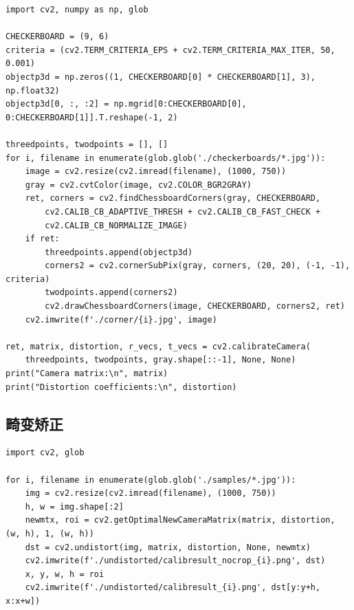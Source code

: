 \documentclass[12pt,a4paper]{ctexart}
\begin{document}
\begin{lstlisting}
import cv2, numpy as np, glob

CHECKERBOARD = (9, 6)
criteria = (cv2.TERM_CRITERIA_EPS + cv2.TERM_CRITERIA_MAX_ITER, 50, 0.001)
objectp3d = np.zeros((1, CHECKERBOARD[0] * CHECKERBOARD[1], 3), np.float32)
objectp3d[0, :, :2] = np.mgrid[0:CHECKERBOARD[0], 0:CHECKERBOARD[1]].T.reshape(-1, 2)

threedpoints, twodpoints = [], []
for i, filename in enumerate(glob.glob('./checkerboards/*.jpg')):
    image = cv2.resize(cv2.imread(filename), (1000, 750))
    gray = cv2.cvtColor(image, cv2.COLOR_BGR2GRAY)
    ret, corners = cv2.findChessboardCorners(gray, CHECKERBOARD,
        cv2.CALIB_CB_ADAPTIVE_THRESH + cv2.CALIB_CB_FAST_CHECK +
        cv2.CALIB_CB_NORMALIZE_IMAGE)
    if ret:
        threedpoints.append(objectp3d)
        corners2 = cv2.cornerSubPix(gray, corners, (20, 20), (-1, -1), criteria)
        twodpoints.append(corners2)
        cv2.drawChessboardCorners(image, CHECKERBOARD, corners2, ret)
    cv2.imwrite(f'./corner/{i}.jpg', image)

ret, matrix, distortion, r_vecs, t_vecs = cv2.calibrateCamera(
    threedpoints, twodpoints, gray.shape[::-1], None, None)
print("Camera matrix:\n", matrix)
print("Distortion coefficients:\n", distortion)
\end{lstlisting}

\subsection{畸变矫正}

\begin{lstlisting}
import cv2, glob

for i, filename in enumerate(glob.glob('./samples/*.jpg')):
    img = cv2.resize(cv2.imread(filename), (1000, 750))
    h, w = img.shape[:2]
    newmtx, roi = cv2.getOptimalNewCameraMatrix(matrix, distortion, (w, h), 1, (w, h))
    dst = cv2.undistort(img, matrix, distortion, None, newmtx)
    cv2.imwrite(f'./undistorted/calibresult_nocrop_{i}.png', dst)
    x, y, w, h = roi
    cv2.imwrite(f'./undistorted/calibresult_{i}.png', dst[y:y+h, x:x+w])
\end{lstlisting}
\end{document}
